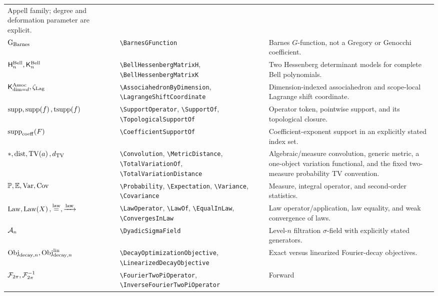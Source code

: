 \documentclass[11pt,oneside]{article}
\theoremstyle{definition}
\theoremstyle{remark}
\DeclareRobustCommand{\commandname}[1]{\texttt{\textbackslash#1}}
\begin{document}
\begin{longtable}{@{}L{0.22\textwidth}S{0.38\textwidth}L{0.34\textwidth}@{}}
Appell family; degree and deformation parameter are explicit.\\
\(\mathrm{G}_{\mathrm{Barnes}}\) & \commandname{BarnesGFunction} & Barnes \(G\)-function,
not a Gregory or Genocchi coefficient.\\
\(\mathsf{H}^{\mathrm{Bell}}_{n},\mathsf{K}^{\mathrm{Bell}}_{n}\) &
\commandname{BellHessenbergMatrixH}, \commandname{BellHessenbergMatrixK} &
Two Hessenberg determinant models for complete Bell polynomials.\\
\(\mathsf{K}^{\mathrm{Assoc}}_{\dim=d},\zeta_{\mathrm{Lag}}\) &
\commandname{AssociahedronByDimension}, \commandname{LagrangeShiftCoordinate}
& Dimension-indexed associahedron and scope-local Lagrange shift coordinate.\\
$\operatorname{supp},\operatorname{supp}\!\left(f\right),\allowbreak\operatorname{tsupp}\!\left(f\right)$ &
\commandname{SupportOperator}, \commandname{SupportOf},
\commandname{TopologicalSupportOf} & Operator token, pointwise support, and its
topological closure.\\
\(\operatorname{supp}_{\mathrm{coeff}}\!\left(F\right)\) & \commandname{CoefficientSupportOf} &
Coefficient-exponent support in an explicitly stated index set.\\
$\mathbin{*},\operatorname{dist},\operatorname{TV}\!\left(a\right),d_{\mathrm{TV}}$ &
\commandname{Convolution}, \commandname{MetricDistance},
\commandname{TotalVariationOf}, \commandname{TotalVariationDistance} &
Algebraic/measure convolution, generic metric, a one-object variation functional, and
the fixed two-measure probability TV convention.\\
$\mathbb{P},\mathbb{E},\operatorname{Var},\operatorname{Cov}$ & \commandname{Probability},
\commandname{Expectation}, \commandname{Variance}, \commandname{Covariance} & Measure,
integral operator, and second-order statistics.\\
$\operatorname{Law},\operatorname{Law}\!\left(X\right),\mathrel{\overset{\mathrm{law}}{=}},\mathrel{\xrightarrow{\mathrm{law}}}$ & \commandname{LawOperator},
\commandname{LawOf}, \commandname{EqualInLaw}, \commandname{ConvergesInLaw} & Law
operator/application, law equality, and weak convergence of laws.\\
$\mathcal{A}_n$ & \commandname{DyadicSigmaField} & Level-$n$ filtration
$\sigma$-field with explicitly stated generators.\\
$\operatorname{Obj}_{\mathrm{decay},n},\operatorname{Obj}^{\mathrm{lin}}_{\mathrm{decay},n}$ &
\commandname{DecayOptimizationObjective}, \commandname{LinearizedDecayObjective} &
Exact versus linearized Fourier-decay objectives.\\
$\mathcal{F}_{2\pi},\mathcal{F}_{2\pi}^{-1}$ &
\commandname{FourierTwoPiOperator}, \commandname{InverseFourierTwoPiOperator} & Forward

\end{longtable}
\end{document}
